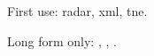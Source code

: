 \documentclass[12pt]{article}
\begin{document}
First use: \gls{radar}, \gls{xml}, \gls{tne}. 

Long form only: , , .
\printglossaries 
\end{document}

